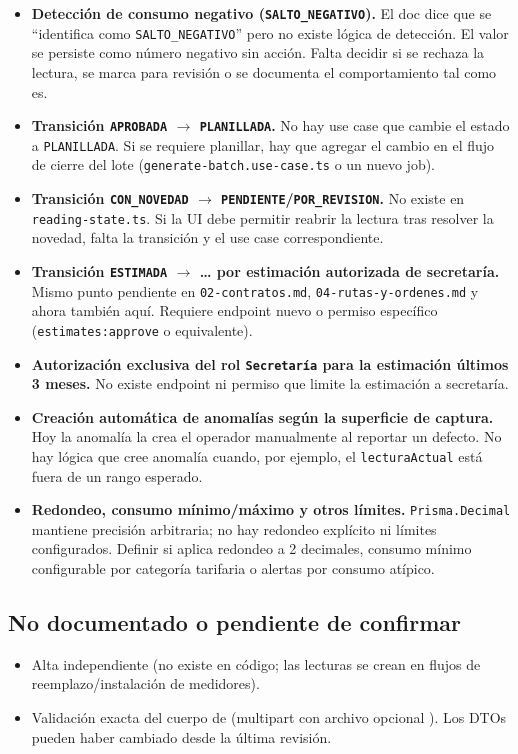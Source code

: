 \begin{itemize}
\item \textbf{Detección de consumo negativo (\texttt{SALTO\_NEGATIVO}).} El doc dice que se ``identifica como \texttt{SALTO\_NEGATIVO}'' pero no existe lógica de detección. El valor se persiste como número negativo sin acción. Falta decidir si se rechaza la lectura, se marca para revisión o se documenta el comportamiento tal como es.
\item \textbf{Transición \texttt{APROBADA} $\rightarrow$ \texttt{PLANILLADA}.} No hay use case que cambie el estado a \texttt{PLANILLADA}. Si se requiere planillar, hay que agregar el cambio en el flujo de cierre del lote (\texttt{generate-batch.use-case.ts} o un nuevo job).
\item \textbf{Transición \texttt{CON\_NOVEDAD} $\rightarrow$ \texttt{PENDIENTE}/\texttt{POR\_REVISION}.} No existe en \texttt{reading-state.ts}. Si la UI debe permitir reabrir la lectura tras resolver la novedad, falta la transición y el use case correspondiente.
\item \textbf{Transición \texttt{ESTIMADA} $\rightarrow$ \ldots{} por estimación autorizada de secretaría.} Mismo punto pendiente en \texttt{02-contratos.md}, \texttt{04-rutas-y-ordenes.md} y ahora también aquí. Requiere endpoint nuevo o permiso específico (\texttt{estimates:approve} o equivalente).
\item \textbf{Autorización exclusiva del rol \texttt{Secretaría} para la estimación últimos 3 meses.} No existe endpoint ni permiso que limite la estimación a secretaría.
\item \textbf{Creación automática de anomalías según la superficie de captura.} Hoy la anomalía la crea el operador manualmente al reportar un defecto. No hay lógica que cree anomalía cuando, por ejemplo, el \texttt{lecturaActual} está fuera de un rango esperado.
\item \textbf{Redondeo, consumo mínimo/máximo y otros límites.} \texttt{Prisma.Decimal} mantiene precisión arbitraria; no hay redondeo explícito ni límites configurados. Definir si aplica redondeo a 2 decimales, consumo mínimo configurable por categoría tarifaria o alertas por consumo atípico.
\end{itemize}

\subsection{No documentado o pendiente de confirmar}


\begin{itemize}
\item Alta independiente \texttt{} (no existe en código; las lecturas se crean en flujos de reemplazo/instalación de medidores).
\item Validación exacta del cuerpo de \texttt{} (multipart con archivo opcional \texttt{}). Los DTOs pueden haber cambiado desde la última revisión.
\end{itemize}

